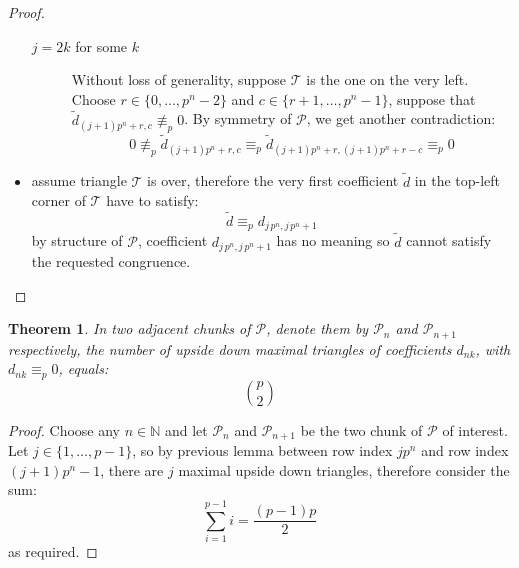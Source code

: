 \documentclass[11pt,a4paper]{article} %
\newtheorem{theorem}{Theorem}[section]
\begin{document}
\begin{proof}
\begin{itemize}
\begin{description}
                    \item[$j=2k$ for some $k$] Without loss of generality, suppose  $\mathcal{T}$ is the one on the very left. 
                    Choose $r \in\lbrace 0,\ldots,p^n-2\rbrace$ and $c \in\lbrace r+1,\ldots,p^n-1\rbrace$,
                    suppose that $\tilde{d}_{(j+1) p^n +r, c}\not\equiv_{p}0$. 
                    By symmetry of $\mathcal{P}$, we get another contradiction: 
                    \begin{displaymath}
                        0\not\equiv_{p}\tilde{d}_{(j+1) p^n +r, c} \equiv_{p} \tilde{d}_{(j+1) p^n +r, (j+1) p^n +r-c}\equiv_{p}0
                    \end{displaymath}
                \end{description}
            \item assume triangle $\mathcal{T}$ is over, therefore the very first coefficient 
                $\tilde{d}$ in the top-left corner of $\mathcal{T}$ have to satisfy:
                \begin{displaymath}
                     \tilde{d} \equiv_{p} d_{j\,p^{n},j\,p^{n}+1}
                \end{displaymath}
                by structure of $\mathcal{P}$, coefficient $d_{j\,p^{n},j\,p^{n}+1}$ has no
                meaning so $\tilde{d}$ cannot satisfy the requested congruence.
        \end{itemize}
    \end{proof}
    

    \begin{theorem}
        In two adjacent chunks of $\mathcal{P}$, denote them by $\mathcal{P}_n$
        and $\mathcal{P}_{n+1}$ respectively, the
        number of upside down maximal triangles of coefficients $d_{nk}$, with
        $d_{nk} \equiv_p 0$, equals:
        \begin{displaymath}
            {{p}\choose{2}}
        \end{displaymath}
    \end{theorem}

    \begin{proof}
        Choose any $n\in\mathbb{N}$ and let $\mathcal{P}_n$ and $\mathcal{P}_{n+1}$
        be the two chunk of $\mathcal{P}$ of interest. Let $j\in\lbrace 1, \ldots, p-1 \rbrace$, so
        by previous lemma between row index $j p^n$ and
        row index $(j+1)p^n -1$, there are $j$ maximal upside down triangles, therefore consider the sum:
        \begin{displaymath}
            \sum_{i=1}^{p-1}{i} = \frac{(p-1)p}{2}
        \end{displaymath}
        as required.

    \end{proof}
\end{document}
